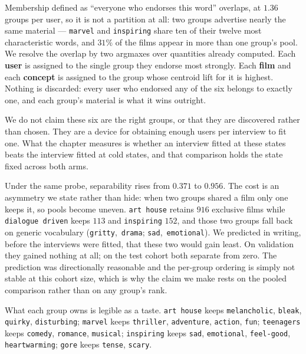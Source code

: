 \documentclass[11pt]{article}
\begin{document}
Membership defined as ``everyone who endorses this word'' overlaps, at $1.36$ groups per user, so it
is not a partition at all: two groups advertise nearly the same material --- \texttt{marvel} and
\texttt{inspiring} share ten of their twelve most characteristic words, and $31\%$ of the films
appear in more than one group's pool. We resolve the overlap by two argmaxes over quantities already
computed. Each \textbf{user} is assigned to the single group they endorse most strongly. Each
\textbf{film} and each \textbf{concept} is assigned to the group whose centroid lift for it is
highest. Nothing is discarded: every user who endorsed any of the six belongs to exactly one, and
each group's material is what it wins outright.

We do not claim these six are the right groups, or that they are discovered rather than chosen. They
are a device for obtaining enough users per interview to fit one. What the chapter measures is
whether an interview fitted at these states beats the interview fitted at cold states, and that
comparison holds the state fixed across both arms.

Under the same probe, separability rises from $0.371$ to $\mathbf{0.956}$. The cost is an asymmetry we
state rather than hide: when two groups shared a film only one keeps it, so pools become uneven.
\texttt{art house} retains $916$ exclusive films while \texttt{dialogue driven} keeps $113$ and
\texttt{inspiring} $152$, and those two groups fall back on generic vocabulary
(\texttt{gritty},~\texttt{drama}; \texttt{sad},~\texttt{emotional}). We predicted in writing, before
the interviews were fitted, that these two would gain least. On validation they gained nothing at all;
on the test cohort both separate from zero. The prediction was directionally reasonable and the
per-group ordering is simply not stable at this cohort size, which is why the claim we make rests on
the pooled comparison rather than on any group's rank.

What each group owns is legible as a taste. \texttt{art house} keeps \texttt{melancholic},
\texttt{bleak}, \texttt{quirky}, \texttt{disturbing}; \texttt{marvel} keeps \texttt{thriller},
\texttt{adventure}, \texttt{action}, \texttt{fun}; \texttt{teenagers} keeps \texttt{comedy},
\texttt{romance}, \texttt{musical}; \texttt{inspiring} keeps \texttt{sad}, \texttt{emotional},
\texttt{feel-good}, \texttt{heartwarming}; \texttt{gore} keeps \texttt{tense}, \texttt{scary}.
\end{document}
